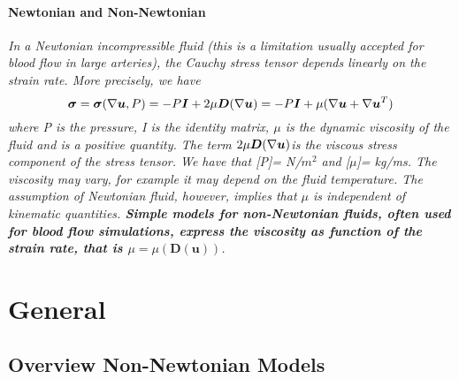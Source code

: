 \documentclass[11pt,letterpaper]{article}
\begin{document}
\paragraph{Newtonian and Non-Newtonian}
\textit{ In a Newtonian incompressible fluid (this is a limitation usually accepted for blood flow in large arteries), the Cauchy stress tensor depends
linearly on the strain rate. More precisely, we have \begin{equation}
    \bm{\sigma} = \bm{\sigma}(\nabla\bm{u},P)= -P\bm{I} +2\mu\bm{D}(\nabla\bm{u})= -P\bm{I} + \mu(\nabla\bm{u}+\nabla\bm{u}^T)
\end{equation}
where P is the pressure, I is the identity matrix, $\mu$ is the dynamic viscosity of the fluid and is a positive quantity. The term $2\mu\bm{D}(\nabla\bm{u})$is the viscous stress component of the stress tensor. We
have that [P]= N/$m^2$ and [$\mu$]= kg/ms. The viscosity may vary, for example it may depend on the fluid temperature. The assumption of Newtonian fluid, however, implies that $\mu$ is independent of kinematic quantities. \textbf{Simple models for non-Newtonian fluids, often used for blood flow simulations, express the viscosity as function of the strain rate, that is $\mu = \mu(\bm{D}(\bm{u}))$}. }

\newpage
\section{General}

\subsection*{Overview Non-Newtonian Models
}


\newpage
\end{document}
